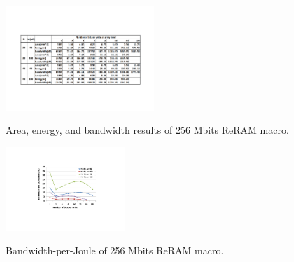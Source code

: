 \begin{figure}[!t]
\centering\label{fig:aaable}
  \includegraphics[width=0.5\textwidth]{./figures/Table}\\
  \caption{Area, energy, and bandwidth results of 256 Mbits ReRAM macro.}
  \vspace{-5pt}
\end{figure}


\begin{figure}[!t]
\centering\label{fig:EpJ}
  \includegraphics[width=0.4\textwidth]{./figures/EpJ}\\
  \caption{Bandwidth-per-Joule of 256 Mbits ReRAM macro.}
  \vspace{-5pt}
\end{figure}

